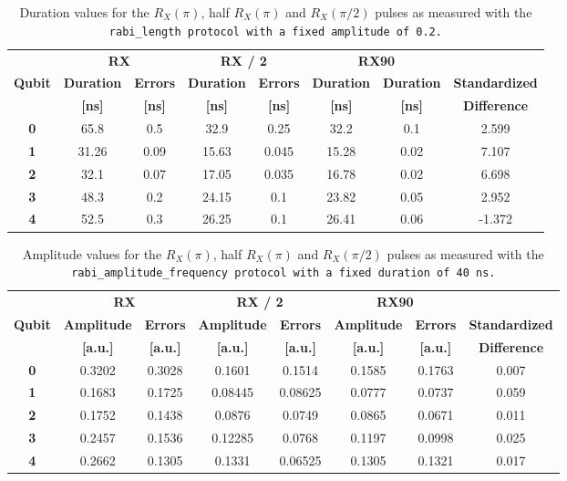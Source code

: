\begin{table}[h!]
    \centering
    \begin{tabular}{c|cc|cc|cc|c}
        \toprule
         & \multicolumn{2}{c|}{\textbf{RX}} & \multicolumn{2}{c|}{\textbf{RX / 2}} & \multicolumn{2}{c|}{\textbf{RX90}} & \textbf{} \\
        \textbf{Qubit} & \textbf{Duration} & \textbf{Errors} & \textbf{Duration} & \textbf{Errors} & \textbf{Duration} & \textbf{Duration} & \textbf{Standardized} \\
         & \textbf{[ns]}  & \textbf{[ns]}  & \textbf{[ns]}  & \textbf{[ns]} & \textbf{[ns]} & \textbf{[ns]} & \textbf{Difference} \\
        \midrule
        \textbf{0} & 65.8 & 0.5 & 32.9 & 0.25 & 32.2 & 0.1 & 2.599 \\
        \textbf{1} & 31.26 & 0.09 & 15.63 & 0.045 & 15.28 & 0.02 & 7.107\\
        \textbf{2} & 32.1 & 0.07 & 17.05 & 0.035 & 16.78 & 0.02 & 6.698\\
        \textbf{3} & 48.3 & 0.2 & 24.15 & 0.1 & 23.82 & 0.05 & 2.952 \\
        \textbf{4} & 52.5 & 0.3 & 26.25 & 0.1 & 26.41 & 0.06 & -1.372\\
    \end{tabular}
    \caption{Duration values for the $R_X(\pi)$, half $R_X(\pi)$ and $R_X(\pi/2)$ pulses as measured with the \tt{rabi\_length} protocol with a fixed amplitude of 0.2.}
    \label{tab:length}
\end{table}

\begin{table}[h!]
    \centering
    \begin{tabular}{c|cc|cc|cc|c}
        \toprule
         & \multicolumn{2}{c|}{\textbf{RX}} & \multicolumn{2}{c|}{\textbf{RX / 2}} & \multicolumn{2}{c|}{\textbf{RX90}} & \textbf{} \\
        \textbf{Qubit} & \textbf{Amplitude} & \textbf{Errors} & \textbf{Amplitude} & \textbf{Errors} & \textbf{Amplitude} & \textbf{Errors} & \textbf{Standardized} \\
         & \textbf{[a.u.]} & \textbf{[a.u.]} & \textbf{[a.u.]} & \textbf{[a.u.]} & \textbf{[a.u.]} & \textbf{[a.u.]} & \textbf{Difference}\\
        \midrule
        \textbf{0} & 0.3202 & 0.3028 & 0.1601 & 0.1514 & 0.1585 & 0.1763 & 0.007\\
        \textbf{1} & 0.1683 & 0.1725 & 0.08445 & 0.08625 & 0.0777 & 0.0737 & 0.059\\
        \textbf{2} & 0.1752 & 0.1438 & 0.0876 & 0.0749 & 0.0865 & 0.0671 & 0.011\\
        \textbf{3} & 0.2457 & 0.1536 & 0.12285 & 0.0768 & 0.1197 & 0.0998 & 0.025\\
        \textbf{4} & 0.2662 & 0.1305 & 0.1331 & 0.06525 & 0.1305 & 0.1321 & 0.017\\
        \bottomrule
    \end{tabular}
    \caption{Amplitude values for the $R_X(\pi)$, half $R_X(\pi)$ and $R_X(\pi/2)$ pulses as measured with the \tt{rabi\_amplitude\_frequency} protocol with a fixed duration of 40 ns.}
    \label{tab:af}
\end{table}

